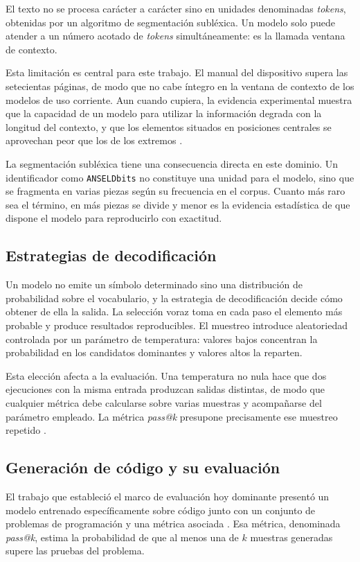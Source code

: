 El texto no se procesa carácter a carácter sino en unidades denominadas
\emph{tokens}, obtenidas por un algoritmo de segmentación subléxica. Un modelo
solo puede atender a un número acotado de \emph{tokens} simultáneamente: es la
llamada ventana de contexto.

Esta limitación es central para este trabajo. El manual del dispositivo supera
las setecientas páginas, de modo que no cabe íntegro en la ventana de contexto
de los modelos de uso corriente. Aun cuando cupiera, la evidencia experimental
muestra que la capacidad de un modelo para utilizar la información degrada con
la longitud del contexto, y que los elementos situados en posiciones centrales
se aprovechan peor que los de los extremos \cite{liu2024lost}.

La segmentación subléxica tiene una consecuencia directa en este dominio. Un
identificador como \texttt{ANSELDbits} no constituye una unidad para el modelo,
sino que se fragmenta en varias piezas según su frecuencia en el corpus. Cuanto
más raro sea el término, en más piezas se divide y menor es la evidencia
estadística de que dispone el modelo para reproducirlo con exactitud.

\subsection{Estrategias de decodificación}

Un modelo no emite un símbolo determinado sino una distribución de probabilidad
sobre el vocabulario, y la estrategia de decodificación decide cómo obtener de
ella la salida. La selección voraz toma en cada paso el elemento más probable y
produce resultados reproducibles. El muestreo introduce aleatoriedad controlada
por un parámetro de temperatura: valores bajos concentran la probabilidad en los
candidatos dominantes y valores altos la reparten.

Esta elección afecta a la evaluación. Una temperatura no nula hace que dos
ejecuciones con la misma entrada produzcan salidas distintas, de modo que
cualquier métrica debe calcularse sobre varias muestras y acompañarse del
parámetro empleado. La métrica \emph{pass@k} presupone precisamente ese
muestreo repetido \cite{chen2021codex}.

\subsection{Generación de código y su evaluación}

El trabajo que estableció el marco de evaluación hoy dominante presentó un
modelo entrenado específicamente sobre código junto con un conjunto de problemas
de programación y una métrica asociada \cite{chen2021codex}. Esa métrica,
denominada \emph{pass@k}, estima la probabilidad de que al menos una de $k$
muestras generadas supere las pruebas del problema.

